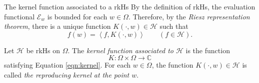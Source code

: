 \documentclass[handout]{beamer}
\newcommand{\C}{\mathbb C}
\newcommand{\calE}{{\mathcal E}}
\newcommand{\calH}{{\mathcal H}}
\newcommand{\ip}[1]{\left\langle #1 \right\rangle}
\begin{document}
\begin{frame}{The kernel function associated to a rkHs}
By the definition of rkHs, the evaluation functional $\calE_{w}$ is bounded for each $w\in \Omega$. Therefore, by the \textit{Riesz representation theorem}, there is a unique function $K\left( \cdot ,w \right) \in \calH$ such that 
\begin{equation}
f(w)=\ip{f, K\left( \cdot , w \right)} \qquad \left( f \in \calH \right).
\label{eqn:kernel}
\end{equation}


\pause
\begin{definition}
Let $\calH$ be rkHs on $\Omega$. The \textit{kernel function associated to $\calH$} is the function
\begin{equation*}
K : \Omega \times \Omega \to \C
\end{equation*}
satisfying Equation \ref{eqn:kernel}. For each $w\in \Omega$, the function $K\left( \cdot , w \right) \in \calH$ is called \textit{the reproducing kernel at the point $w$}.
\label{def:kernel-function}
\end{definition}
\end{frame}
\end{document}
